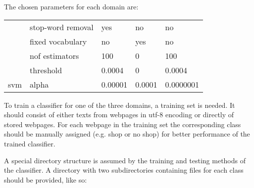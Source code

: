 \documentclass[letterpaper,10pt,english]{sphinxmanual}
\begin{document}
The chosen parameters for each domain are:


\begin{savenotes}\sphinxattablestart
\centering
\begin{tabulary}{\linewidth}[t]{|T|T|T|T|T|}
\hline
\sphinxstyletheadfamily 
{}
&\sphinxstyletheadfamily 
{}
&\sphinxstyletheadfamily 
{}
&\sphinxstyletheadfamily 
{}
&\sphinxstyletheadfamily 
{}
\\
\hline{}%
&
stop-word removal
&
yes
&
no
&
no
\\
&
fixed vocabulary
&
no
&
yes
&
no
\\
\hline{}%
&
nof estimators
&
100
&
0
&
100
\\
&
threshold
&
0.0004
&
0
&
0.0004
\\
\hline
svm
&
alpha
&
0.00001
&
0.0001
&
0.0000001
\\
\hline
\end{tabulary}
\par
\sphinxattableend\end{savenotes}

To train a classifier for one of the three domains, a training set is
needed. It should consist of either texts from webpages in utf-8
encoding or directly of stored webpages. For each webpage in the
training set the corresponding class should be manually assigned
(e.g. shop or no shop) for better performance of the trained
classifier.

A special directory structure is assumed by the training and testing
methods of the classifier. A directory with two subdirectories
containing files for each class should be provided, like so:

%
\begin{sphinxVerbatim}[commandchars=\\\{\}]
\end{sphinxVerbatim}
\end{document}
